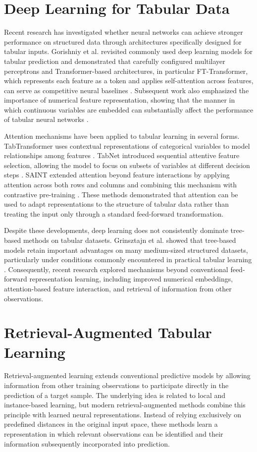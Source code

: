 \documentclass[11pt,a4paper,oneside, openany, reqno, chapter, nokorean]{oblivoir}
\theoremstyle{definition}
\theoremstyle{remark}
\numberwithin{equation}{chapter}
\theoremstyle{definition}
\theoremstyle{remark}
\theoremstyle{definition}
\begin{document}
\section{Deep Learning for Tabular Data}

Recent research has investigated whether neural networks can achieve stronger
performance on structured data through architectures specifically designed for
tabular inputs. Gorishniy et al. revisited commonly used deep learning models
for tabular prediction and demonstrated that carefully configured multilayer perceptrons and
Transformer-based architectures, in particular FT-Transformer, which represents
each feature as a token and applies self-attention across features, can serve
as competitive neural baselines \cite{gorishniy2021revisiting}. Subsequent work also emphasized
the importance of numerical feature representation, showing that the manner in
which continuous variables are embedded can substantially affect the
performance of tabular neural networks \cite{gorishniy2022embeddings}.

Attention mechanisms have been applied to tabular learning in several forms.
TabTransformer uses contextual representations of categorical variables to
model relationships among features \cite{huang2020tabtransformer}. TabNet
introduced sequential attentive feature selection, allowing the model to focus
on subsets of variables at different decision steps
\cite{arik2021tabnet}. SAINT extended attention beyond feature interactions by
applying attention across both rows and columns and combining this mechanism
with contrastive pre-training \cite{somepalli2021saint}. These methods
demonstrated that attention can be used to adapt representations to the
structure of tabular data rather than treating the input only through a
standard feed-forward transformation.

Despite these developments, deep learning does not consistently dominate
tree-based methods on tabular datasets. Grinsztajn et al. showed that
tree-based models retain important advantages on many medium-sized structured
datasets, particularly under conditions commonly encountered in practical
tabular learning \cite{grinsztajn2022tree}. Consequently, recent research
explored mechanisms beyond conventional feed-forward representation learning,
including improved numerical embeddings, attention-based feature interaction,
and retrieval of information from other observations.


\section{Retrieval-Augmented Tabular Learning}
\label{sec:retrieval-augmented}
Retrieval-augmented learning extends conventional predictive models by allowing
information from other training observations to participate directly in the
prediction of a target sample. The underlying idea is related to local and
instance-based learning, but modern retrieval-augmented methods combine this
principle with learned neural representations. Instead of relying exclusively
on predefined distances in the original input space, these methods learn a
representation in which relevant observations can be identified and their
information subsequently incorporated into prediction.
\end{document}
